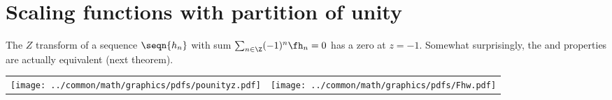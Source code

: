 \section{Scaling functions with partition of unity}

The $Z$ transform  of a sequence $\seqn{h_n}$ 
with sum $\sum_{n\in\Z} (-1)^n\fh_n=0$ has a zero at $z=-1$.
Somewhat surprisingly, the  and
 properties are actually equivalent (next theorem). 

\begin{center}
\begin{tabular}{cc}
  \texttt{[image: ../common/math/graphics/pdfs/pounityz.pdf]}&\texttt{[image: ../common/math/graphics/pdfs/Fhw.pdf]}
\end{tabular}
\end{center}


